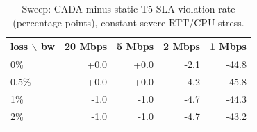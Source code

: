 \begin{table}[t]\centering\caption{Sweep: CADA minus static-T5 SLA-violation rate (percentage points), constant severe RTT/CPU stress.}\label{tab:sweep}\small
\begin{tabular}{lrrrr}\toprule
loss $\backslash$ bw & 20 Mbps & 5 Mbps & 2 Mbps & 1 Mbps \\\midrule
0\% & +0.0 & +0.0 & -2.1 & -44.8 \\
0.5\% & +0.0 & +0.0 & -4.2 & -45.8 \\
1\% & -1.0 & -1.0 & -4.7 & -44.3 \\
2\% & -1.0 & -1.0 & -4.7 & -43.2 \\
\bottomrule\end{tabular}\end{table}
